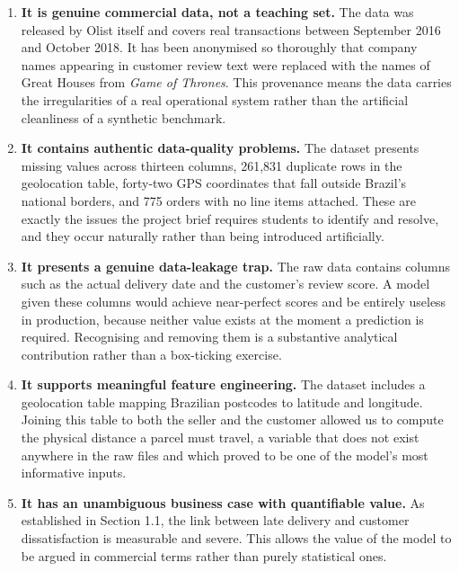 \documentclass[11pt,a4paper]{report}
\begin{document}
\begin{enumerate}[leftmargin=*]

\item \textbf{It is genuine commercial data, not a teaching set.} The data was
released by Olist itself and covers real transactions between September 2016 and
October 2018. It has been anonymised so thoroughly that company names appearing
in customer review text were replaced with the names of Great Houses from
\textit{Game of Thrones}. This provenance means the data carries the
irregularities of a real operational system rather than the artificial
cleanliness of a synthetic benchmark.

\item \textbf{It contains authentic data-quality problems.} The dataset presents
missing values across thirteen columns, 261{,}831 duplicate rows in the
geolocation table, forty-two GPS coordinates that fall outside Brazil's national
borders, and 775 orders with no line items attached. These are exactly the
issues the project brief requires students to identify and resolve, and they
occur naturally rather than being introduced artificially.

\item \textbf{It presents a genuine data-leakage trap.} The raw data contains
columns such as the actual delivery date and the customer's review score. A
model given these columns would achieve near-perfect scores and be entirely
useless in production, because neither value exists at the moment a prediction
is required. Recognising and removing them is a substantive analytical
contribution rather than a box-ticking exercise.

\item \textbf{It supports meaningful feature engineering.} The dataset includes a
geolocation table mapping Brazilian postcodes to latitude and longitude. Joining
this table to both the seller and the customer allowed us to compute the
physical distance a parcel must travel, a variable that does not exist anywhere
in the raw files and which proved to be one of the model's most informative
inputs.

\item \textbf{It has an unambiguous business case with quantifiable value.} As
established in Section 1.1, the link between late delivery and customer
dissatisfaction is measurable and severe. This allows the value of the model to
be argued in commercial terms rather than purely statistical ones.

\end{enumerate}
\end{document}
